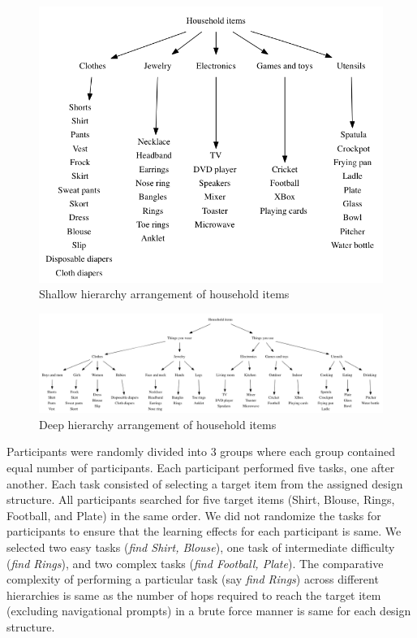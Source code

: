 \documentclass{sigchi}
\begin{document}
\begin{figure}[!h]
\centering
\includegraphics[width=0.9\columnwidth]{ShallowHierarchy}
\caption{Shallow hierarchy arrangement of household items}
\label{fig: Figure1}
\end{figure}

\begin{figure}[!h]
\centering
\includegraphics[width=0.9\columnwidth]{DeepHierarchy}
\caption{Deep hierarchy arrangement of household items}
\label{fig: Figure2}
\end{figure}

Participants were randomly divided into 3 groups where each group contained equal number of participants. Each participant performed five tasks, one after another. Each task consisted of selecting a target item from the assigned design structure. All participants searched for five target items (Shirt, Blouse, Rings, Football, and Plate) in the same order. We did not randomize the tasks for participants to ensure that the learning effects for each participant is same. We selected two easy tasks (\textit{find Shirt, Blouse}), one task of intermediate difficulty (\textit{find Rings}), and two complex tasks (\textit{find Football, Plate}). The comparative complexity of performing a particular task (say \textit{find Rings}) across different hierarchies is same as the number of hops required to reach the target item (excluding navigational prompts) in a brute force manner is same for each design structure.  
\end{document}
